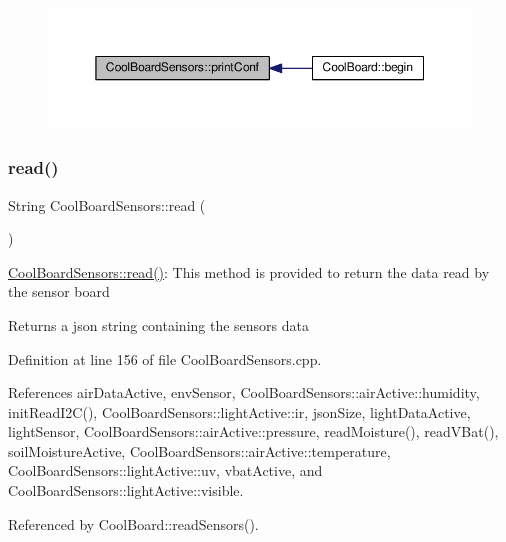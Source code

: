 \begin{figure}[H]
\begin{center}
\leavevmode
\includegraphics[width=350pt]{classCoolBoardSensors_af6fd79505815b204c178617ecf54c873_icgraph}
\end{center}
\end{figure}
\mbox{\label{classCoolBoardSensors_a91badb2539d91fda8679f2a597874c48}} 
\subsubsection{\texorpdfstring{read()}{read()}}
{\footnotesize\ttfamily String Cool\+Board\+Sensors\+::read (\begin{DoxyParamCaption}{ }\end{DoxyParamCaption})}

\hyperlink{classCoolBoardSensors_a91badb2539d91fda8679f2a597874c48}{Cool\+Board\+Sensors\+::read()}\+: This method is provided to return the data read by the sensor board

\begin{DoxyReturn}{Returns}
a json string containing the sensors data 
\end{DoxyReturn}


Definition at line 156 of file Cool\+Board\+Sensors.\+cpp.



References air\+Data\+Active, env\+Sensor, Cool\+Board\+Sensors\+::air\+Active\+::humidity, init\+Read\+I2\+C(), Cool\+Board\+Sensors\+::light\+Active\+::ir, json\+Size, light\+Data\+Active, light\+Sensor, Cool\+Board\+Sensors\+::air\+Active\+::pressure, read\+Moisture(), read\+V\+Bat(), soil\+Moisture\+Active, Cool\+Board\+Sensors\+::air\+Active\+::temperature, Cool\+Board\+Sensors\+::light\+Active\+::uv, vbat\+Active, and Cool\+Board\+Sensors\+::light\+Active\+::visible.



Referenced by Cool\+Board\+::read\+Sensors().


